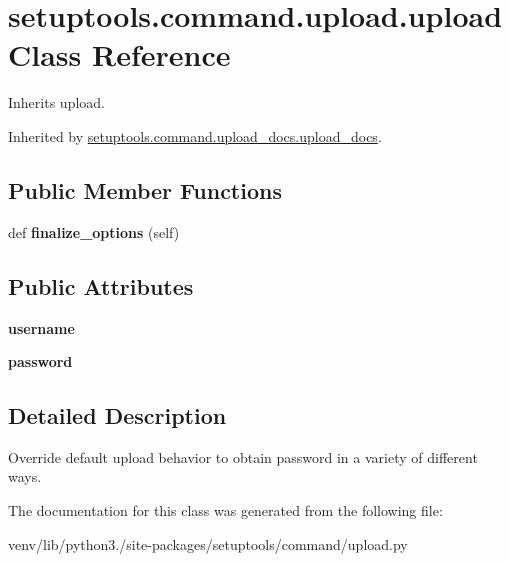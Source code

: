 \hypertarget{classsetuptools_1_1command_1_1upload_1_1upload}{}\section{setuptools.\+command.\+upload.\+upload Class Reference}
\label{classsetuptools_1_1command_1_1upload_1_1upload}


Inherits upload.



Inherited by \hyperlink{classsetuptools_1_1command_1_1upload__docs_1_1upload__docs}{setuptools.\+command.\+upload\+\_\+docs.\+upload\+\_\+docs}.

\subsection*{Public Member Functions}
\begin{DoxyCompactItemize}
\item 
\mbox{\label{classsetuptools_1_1command_1_1upload_1_1upload_ac1926fa9637fa87c0efab64f880b1245}} 
def {\bfseries finalize\+\_\+options} (self)
\end{DoxyCompactItemize}
\subsection*{Public Attributes}
\begin{DoxyCompactItemize}
\item 
\mbox{\label{classsetuptools_1_1command_1_1upload_1_1upload_a70ac802732dee104b6d9060b4fe02576}} 
{\bfseries username}
\item 
\mbox{\label{classsetuptools_1_1command_1_1upload_1_1upload_a371ffad224ea1d5a181257400a83ceff}} 
{\bfseries password}
\end{DoxyCompactItemize}


\subsection{Detailed Description}
\begin{DoxyVerb}Override default upload behavior to obtain password
in a variety of different ways.
\end{DoxyVerb}
 

The documentation for this class was generated from the following file\+:\begin{DoxyCompactItemize}
\item 
venv/lib/python3./site-\/packages/setuptools/command/upload.\+py\end{DoxyCompactItemize}
